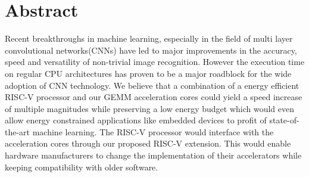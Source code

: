 \twocolumn
\section{Abstract}
Recent breakthroughs in machine learning, especially in the field of multi layer convolutional networks(CNNs) have
led to major improvements in the accuracy, speed and versatility of non-trivial image recognition. However the
execution time on regular CPU architectures has proven to be a major roadblock for the wide adoption of CNN technology. 
We believe that a combination of a energy efficient RISC-V processor and our GEMM
acceleration cores could yield a speed increase of multiple magnitudes while preserving a low energy budget which 
would even allow energy constrained applications like embedded devices to profit of state-of-the-art machine
learning. The RISC-V processor would interface with the acceleration cores through our proposed RISC-V extension.
This would enable hardware manufacturers to change the implementation of their accelerators while keeping compatibility
with older software.
